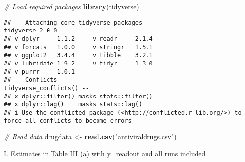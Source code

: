 \documentclass[
]{article}
\newenvironment{Shaded}{\begin{snugshade}}{\end{snugshade}}
\newcommand{\CommentTok}[1]{\textcolor[rgb]{0.56,0.35,0.01}{\textit{#1}}}
\newcommand{\FunctionTok}[1]{\textcolor[rgb]{0.13,0.29,0.53}{\textbf{#1}}}
\newcommand{\NormalTok}[1]{#1}
\newcommand{\OtherTok}[1]{\textcolor[rgb]{0.56,0.35,0.01}{#1}}
\newcommand{\StringTok}[1]{\textcolor[rgb]{0.31,0.60,0.02}{#1}}
\begin{document}
\begin{Shaded}
\begin{Highlighting}[]
\CommentTok{\# Load required packages}
\FunctionTok{library}\NormalTok{(tidyverse)}
\end{Highlighting}
\end{Shaded}

\begin{verbatim}
## -- Attaching core tidyverse packages ------------------------ tidyverse 2.0.0 --
## v dplyr     1.1.2     v readr     2.1.4
## v forcats   1.0.0     v stringr   1.5.1
## v ggplot2   3.4.4     v tibble    3.2.1
## v lubridate 1.9.2     v tidyr     1.3.0
## v purrr     1.0.1     
## -- Conflicts ------------------------------------------ tidyverse_conflicts() --
## x dplyr::filter() masks stats::filter()
## x dplyr::lag()    masks stats::lag()
## i Use the conflicted package (<http://conflicted.r-lib.org/>) to force all conflicts to become errors
\end{verbatim}

\begin{Shaded}
\begin{Highlighting}[]
\CommentTok{\# Read data}
\NormalTok{drugdata }\OtherTok{\textless{}{-}} \FunctionTok{read.csv}\NormalTok{(}\StringTok{"antiviraldrugs.csv"}\NormalTok{)}
\end{Highlighting}
\end{Shaded}

I. Estimates in Table III (a) with y=readout and all runs included
\end{document}
